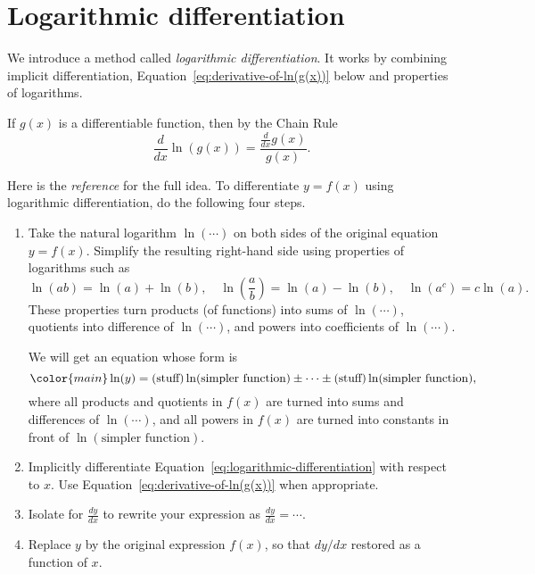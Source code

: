 \documentclass[../main.tex]{subfiles}
\begin{document}
 \section{Logarithmic differentiation}
  We introduce a method called \emph{logarithmic differentiation}. It works by combining implicit differentiation, Equation~\eqref{eq:derivative-of-ln(g(x))} below and properties of logarithms.
  \begin{mdframed}[style=withref]
    If \(g(x)\) is a differentiable function, then by the Chain Rule
    \begin{equation} \label{eq:derivative-of-ln(g(x))}
      \frac{d}{dx} \ln( g(x) ) = \frac{\frac{d}{dx}g(x)}{g(x)}.
    \end{equation}

  \end{mdframed}

  Here is the \emph{reference} for the full idea. To differentiate \(y = f(x)\) using logarithmic differentiation, do the following four steps.
  \begin{enumerate}
    \item Take the natural logarithm \(\ln(\cdots{})\) on both sides of the original equation \(y = f(x)\). Simplify the resulting right-hand side using properties of logarithms such as 
      \[
        \ln(ab) = \ln(a) + \ln(b), \quad \ln\left(\frac{a}{b}\right) = \ln(a) - \ln(b), \quad \ln(a^{c}) = c \ln(a). 
      \]
      These properties turn products (of functions) into sums of \(\ln(\cdots)\), quotients into difference of \(\ln(\cdots)\), and powers into coefficients of \(\ln(\cdots)\).

      We will get an equation whose form is 
      \begin{equation} \label{eq:logarithmic-differentiation}
        \color{main}
        \ln(y) = (\text{stuff})\ln( \text{simpler function} ) \pm \cdots \pm (\text{stuff})\ln( \text{simpler function} ),
      \end{equation}
      where all products and quotients in \(f(x)\) are turned into sums and differences of \(\ln(\cdots)\), and all powers in \(f(x)\) are turned into constants in front of \(\ln(\text{simpler function})\).


    \item Implicitly differentiate Equation~\eqref{eq:logarithmic-differentiation} with respect to \(x\). Use Equation~\eqref{eq:derivative-of-ln(g(x))} when appropriate.

    \item Isolate for \(\frac{dy}{dx}\) to rewrite your expression as \(\frac{dy}{dx} = \cdots\). 
    \item Replace \(y\) by the original expression \(f(x)\), so that \(dy/dx\) restored as a function of \(x\).
  \end{enumerate}
  \clearpage
\end{document}
